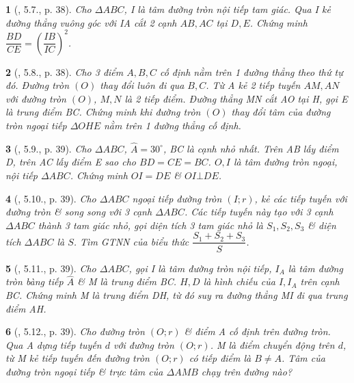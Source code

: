 \documentclass{article}
\newtheorem{baitoan}{}
\begin{document}
\begin{baitoan}[\cite{TLCT_THCS_Toan_9_hinh_hoc}, 5.7., p. 38]
	Cho $\Delta ABC$, I là tâm đường tròn nội tiếp tam giác. Qua I kẻ đường thẳng vuông góc với IA cắt 2 cạnh $AB,AC$ tại $D,E$. Chứng minh $\dfrac{BD}{CE} = \left(\dfrac{IB}{IC}\right)^2$.
\end{baitoan}

\begin{baitoan}[\cite{TLCT_THCS_Toan_9_hinh_hoc}, 5.8., p. 38]
	Cho 3 điểm $A,B,C$ cố định nằm trên 1 đường thẳng theo thứ tự đó. Đường tròn $(O)$ thay đổi luôn đi qua $B,C$. Từ A kẻ 2 tiếp tuyến $AM,AN$ với đường tròn $(O)$, $M,N$ là 2 tiếp điểm. Đường thẳng MN cắt AO tại H, gọi E là trung điểm BC. Chứng minh khi đường tròn $(O)$ thay đổi tâm của đường tròn ngoại tiếp $\Delta OHE$ nằm trên 1 đường thẳng cố định.
\end{baitoan}

\begin{baitoan}[\cite{TLCT_THCS_Toan_9_hinh_hoc}, 5.9., p. 39]
	Cho $\Delta ABC$, $\widehat{A} = 30^\circ$, BC là cạnh nhỏ nhất. Trên AB lấy điểm D, trên AC lấy điểm E sao cho $BD = CE = BC$. $O,I$ là tâm đường tròn ngoại, nội tiếp $\Delta ABC$. Chứng minh $OI = DE$ \& $OI\bot DE$.
\end{baitoan}

\begin{baitoan}[\cite{TLCT_THCS_Toan_9_hinh_hoc}, 5.10., p. 39]
	Cho $\Delta ABC$ ngoại tiếp đường tròn $(I;r)$, kẻ các tiếp tuyến với đường tròn \& song song với 3 cạnh $\Delta ABC$. Các tiếp tuyến này tạo với 3 cạnh $\Delta ABC$ thành 3 tam giác nhỏ, gọi diện tích 3 tam giác nhỏ là $S_1,S_2,S_3$ \& diện tích $\Delta ABC$ là $S$. Tìm {\rm GTNN} của biểu thức $\dfrac{S_1 + S_2 + S_3}{S}$.
\end{baitoan}

\begin{baitoan}[\cite{TLCT_THCS_Toan_9_hinh_hoc}, 5.11., p. 39]
	Cho $\Delta ABC$, gọi I là tâm đường tròn nội tiếp, $I_A$ là tâm đường tròn bàng tiếp $\widehat{A}$ \& M là trung điểm BC. $H,D$ là hình chiếu của $I,I_A$ trên cạnh BC. Chứng minh M là trung điểm DH, từ đó suy ra đường thẳng MI đi qua trung điểm AH.
\end{baitoan}

\begin{baitoan}[\cite{TLCT_THCS_Toan_9_hinh_hoc}, 5.12., p. 39]
	Cho đường tròn $(O;r)$ \& điểm A cố định trên đường tròn. Qua A dựng tiếp tuyến $d$ với đường tròn $(O;r)$. M là điểm chuyển động trên $d$, từ M kẻ tiếp tuyến đến đường tròn $(O;r)$ có tiếp điểm là $B\ne A$. Tâm của đường tròn ngoại tiếp \& trực tâm của $\Delta AMB$ chạy trên đường nào?
\end{baitoan}
\end{document}
